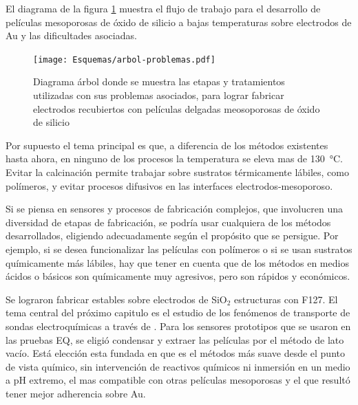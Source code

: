 	El diagrama de la figura \ref{fig:flujo-trabajo} muestra el flujo de trabajo para el desarrollo de películas mesoporosas de óxido de silicio a bajas temperaturas sobre electrodos de Au y las dificultades asociadas.

		\begin{figure}[!ht]
			\begin{center}
			\texttt{[image: Esquemas/arbol-problemas.pdf]}
			\caption[Flujo de trabajo para obtener electrodos con películas mesoporosa]{Diagrama árbol donde se muestra las etapas y tratamientos utilizadas con sus problemas asociados, para lograr fabricar electrodos recubiertos con películas delgadas meosoporosas de óxido de silicio}
			\label{fig:flujo-trabajo}
			\end{center}
			\end{figure}	
	
	Por supuesto el tema principal es que, a diferencia de los métodos existentes hasta ahora, en ninguno de los procesos la temperatura se eleva mas de \SI{130}{\celsius}. Evitar la calcinación permite trabajar sobre sustratos térmicamente lábiles, como polímeros, y evitar procesos difusivos en las interfaces electrodos-mesoporoso. 

	Si se piensa en sensores y procesos de fabricación complejos, que involucren una diversidad de etapas de fabricación, se podría usar cualquiera de los métodos desarrollados, eligiendo adecuadamente según el propósito que se persigue. Por ejemplo, si se desea funcionalizar las películas con polímeros o si se usan sustratos químicamente más lábiles, hay que tener en cuenta que de los métodos en medios ácidos o básicos son químicamente muy agresivos, pero son rápidos y económicos. 

	Se lograron fabricar \pdm\space estables sobre electrodos de SiO$_2$ estructuras con F127. El tema central del próximo capitulo es el estudio de los fenómenos de transporte de sondas electroquímicas a través de \pdm. Para los sensores prototipos que se usaron en las pruebas EQ, se eligió condensar y extraer las películas por el método de lato vacío. Está elección esta fundada en que es el métodos más suave desde el punto de vista químico, sin intervención de reactivos químicos ni inmersión en un medio a pH extremo, el mas compatible con otras películas mesoporosas y el que resultó tener mejor adherencia sobre Au. 			 

